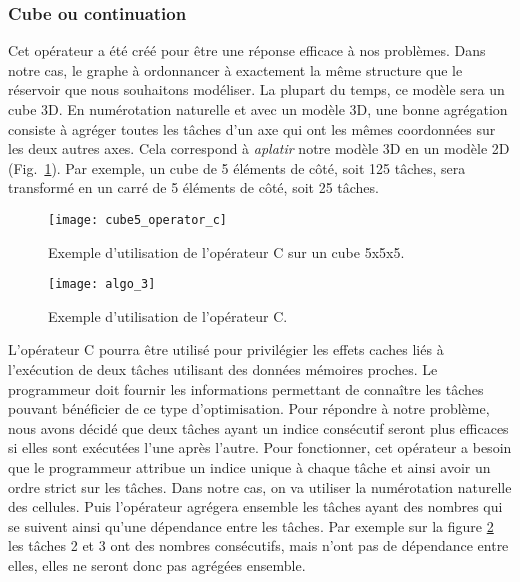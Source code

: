 \subsubsection{Cube ou continuation}
Cet opérateur a été créé pour être une réponse efficace à nos problèmes.
%
Dans notre cas, le graphe à ordonnancer à exactement la même structure que le réservoir que nous souhaitons modéliser.
%
La plupart du temps, ce modèle sera un cube 3D.
%
En numérotation naturelle et avec un modèle 3D, une bonne agrégation consiste à agréger toutes les tâches d'un axe qui ont les mêmes coordonnées sur les deux autres axes.
%
Cela correspond à {\em aplatir} notre modèle 3D en un modèle 2D (Fig.~\ref{fig:cube5_algo_C}).
%
Par exemple, un cube de 5 éléments de côté, soit 125 tâches, sera transformé en un carré de 5 éléments de côté, soit 25 tâches.

\begin{figure}
  \centering
  \texttt{[image: cube5\_operator\_c]}
  \caption{Exemple d'utilisation de l'opérateur C sur un cube 5x5x5.}
  \label{fig:cube5_algo_C}
\end{figure}

\begin{figure}
  \centering
  \texttt{[image: algo\_3]}
  \caption{Exemple d'utilisation de l'opérateur C.}
  \label{fig:algo_C}
\end{figure}

L'opérateur C pourra être utilisé pour privilégier les effets caches liés à l'exécution de deux tâches utilisant des données mémoires proches.
%
Le programmeur doit fournir les informations permettant de connaître les tâches pouvant bénéficier de ce type d'optimisation.
%
Pour répondre à notre problème, nous avons décidé que deux tâches ayant un indice consécutif seront plus efficaces si elles sont exécutées l'une après l'autre.
%
Pour fonctionner, cet opérateur a besoin que le programmeur attribue un indice unique à chaque tâche et ainsi avoir un ordre strict sur les tâches.
%
Dans notre cas, on va utiliser la numérotation naturelle des cellules.
%
Puis l'opérateur agrégera ensemble les tâches ayant des nombres qui se suivent ainsi qu'une dépendance entre les tâches.
%
Par exemple sur la figure \ref{fig:algo_C} les tâches 2 et 3 ont des nombres consécutifs, mais n'ont pas de dépendance entre elles, elles ne seront donc pas agrégées ensemble.

